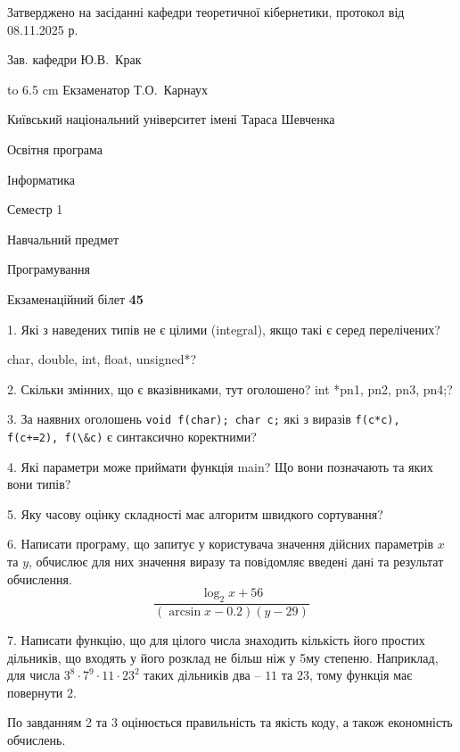 \documentclass[12pt, ukrainian]{article}
\def\code#1{\Verb!#1!}
\begin{document}
{\smallskip\smallskip \begin {scriptsize} Затверджено на засіданні кафедри теоретичної кібернетики, протокол   від   08.11.2025 р.\par\smallskip\smallskip\smallskip\smallskip
{\parbox {6.5 cm} {Зав. кафедри \dotfill Ю.В.~Крак}}\hspace {0.7cm} {\hbox to 6.5 cm { Екзаменатор \dotfill Т.О.~Карнаух}} \end{scriptsize}}
\newpage
{{\begin {scriptsize}\par
{ \center  Київський національний університет імені Тараса Шевченка \par}
{\parbox {5 cm}{Освітня програма \hfill}{\parbox {7 cm}{Інформатика\hfill}}\parbox {6 cm}{\hfill Семестр 1}}\par
{\parbox {5 cm} {Навчальний предмет \hfill}\parbox {7 cm}{Програмування \hfill}\parbox {6cm}{\hfill}\par}\vspace{-15pt} \end{scriptsize}}{\center Екзаменаційний білет \No \textbf { 45 }\par}}
{%
1. Які з наведених типів не є цілими (integral), якщо такі є серед перелічених?

char, double, int, float, unsigned*?
\par
\vspace{2mm}
2. Скільки змінних, що є вказівниками, тут оголошено?
int *pn1, pn2, pn3, pn4;?
\par
\vspace{2mm}
3. За наявних оголошень \code{void f(char); char c;} які з виразів \code{f(c*c), f(c+=2), f(\&c)} є синтаксично коректними?
\par
\vspace{2mm}
4. Які параметри може приймати функція main? Що вони позначають та яких вони типів?
\par
\vspace{2mm}
5. Яку часову оцінку складності має алгоритм швидкого сортування?
\par
\vspace{2mm}
6. Написати програму, що запитує у користувача значення дійсних параметрів $x$ та $y$, обчислює для них значення виразу та повiдомляє введенi данi та результат обчислення.
$$\frac{\log_{2} x + 56}{(\arcsin x - 0.2) (y - 29)}$$ 

\par
7. Написати функцію, що для цілого числа знаходить кількість його простих дільників, що входять у його розклад не більш ніж у 5му степеню. Наприклад, для числа $3^8{\cdot}7^9{\cdot}11{\cdot}23^{2}$ таких дільників два – $11$ та $23$, тому функція має повернути $2$.

По завданням 2 та 3 оцінюється правильність та якість коду, а також економність обчислень.

}
\end{document}
